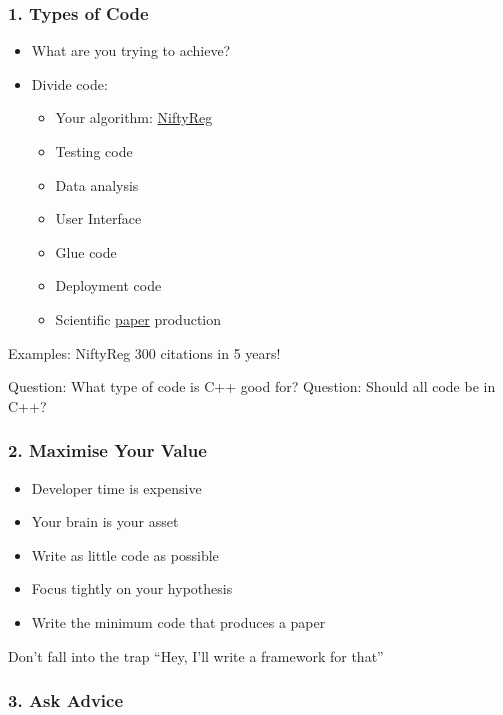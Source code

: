 \subsubsection{1. Types of Code}\label{types-of-code}

\begin{itemize}
\itemsep1pt\parskip0pt
\item
  What are you trying to achieve?
\item
  Divide code:

  \begin{itemize}
  \itemsep1pt\parskip0pt
  \item
    Your algorithm:
    \href{http://cmictig.cs.ucl.ac.uk/wiki/index.php/NiftyReg}{NiftyReg}
  \item
    Testing code
  \item
    Data analysis
  \item
    User Interface
  \item
    Glue code
  \item
    Deployment code
  \item
    Scientific
    \href{http://www.sciencedirect.com/science/article/pii/S0169260709002533}{paper}
    production
  \end{itemize}
\end{itemize}

Examples: NiftyReg 300 citations in 5 years!

Question: What type of code is C++ good for? Question: Should all code
be in C++?

\subsubsection{2. Maximise Your Value}\label{maximise-your-value}

\begin{itemize}
\itemsep1pt\parskip0pt
\item
  Developer time is expensive
\item
  Your brain is your asset
\item
  Write as little code as possible
\item
  Focus tightly on your hypothesis
\item
  Write the minimum code that produces a paper
\end{itemize}

Don't fall into the trap ``Hey, I'll write a framework for that''

\subsubsection{3. Ask Advice}\label{ask-advice}


